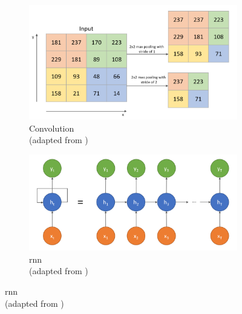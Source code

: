 \begin{figure}[H]
  \centering
  \begin{subfigure}{0.6\textwidth}
    \centering
    \includegraphics[width=\linewidth]{images/cnns.png}
    \captionsetup{justification=centering}
    \caption{Convolution \\(adapted from \cite{rosebrock2021ConvolutionalNeuralNetworks})} \label{fig:cnns}
  \end{subfigure}

  \vspace{0.5cm}

  \begin{subfigure}{0.6\textwidth}
    \centering
    \includegraphics[width=\linewidth]{images/rnns.png}
    \captionsetup{justification=centering}
    \caption{\Gls{rnn} \\(adapted from \cite{radhakrishnan2017IntroductionRecurrentNeural})} \label{fig:rnns}
  \end{subfigure}

  \vspace{0.5cm}


\end{figure}
